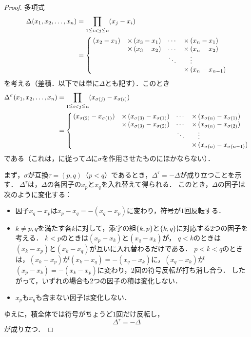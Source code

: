 \begin{tleftbar}
\begin{proof}
  多項式
\begin{align*}
\Delta(x_1,x_2,\dots,x_n)
  &= \prod_{1 \leqq i < j \leqq n}(x_j-x_i) \\
  &= \left\{\,\begin{array}{@{}c@{\quad}r@{\,}l@{\quad}c@{\quad}r@{\,}l@{}}
(x_2-x_1)
  & \times & (x_3-x_1)
  & \cdots
  & \times & (x_n-x_1)\\
  & \times & (x_3-x_2)
  & \cdots
  & \times & (x_n-x_2)\\
  &        &
  & \ddots
  &        & \vdots\\
  &        &
  &
  & \times & (x_n-x_{n-1})
\end{array}\right.
\end{align*}
  を考える（差積．以下では単に$\Delta$とも記す）．このとき
\begin{align*}
\Delta^{\sigma}(x_1,x_2,\dots,x_n)
  &= \prod_{1 \leqq i < j \leqq n}
     (x_{\sigma(j)}-x_{\sigma(i)}) \\
  &= \left\{\,\begin{array}{@{}c@{\quad}r@{\,}l@{\quad}c@{\quad}r@{\,}l@{}}
(x_{\sigma(2)}-x_{\sigma(1)})
  & \times & (x_{\sigma(3)}-x_{\sigma(1)})
  & \cdots
  & \times & (x_{\sigma(n)}-x_{\sigma(1)})\\
  & \times & (x_{\sigma(3)}-x_{\sigma(2)})
  & \cdots
  & \times & (x_{\sigma(n)}-x_{\sigma(2)})\\
  &        &
  & \ddots
  &        & \vdots\\
  &        &
  &
  & \times & (x_{\sigma(n)}-x_{\sigma(n-1)})
\end{array}\right.
\end{align*}
  である（これは，に従って$\Delta$に$\sigma$を作用させたものにほかならない）．

  まず，$\sigma$が互換$\tau = (p, q)$（$p < q$）であるとき，$\Delta^{\tau} = -\Delta$が成り立つことを示す．
  $\Delta^{\tau}$は，$\Delta$の各因子の$x_p$と$x_q$を入れ替えて得られる．
  このとき，$\Delta$の因子は次のように変化する：
  \begin{itemize}
    \item 因子$x_q - x_p$は$x_p - x_q = -(x_q - x_p)$に変わり，符号が$1$回反転する．
    \item $k \ne p, q$を満たす各$k$に対して，添字の組$\{k, p\}$と$\{k, q\}$に対応する$2$つの因子を考える．
      $k < p$のときは$(x_p - x_k)$と$(x_q - x_k)$が，
      $q < k$のときは$(x_k - x_p)$と$(x_k - x_q)$が互いに入れ替わるだけである．
      $p < k < q$のときは，$(x_k - x_p)$が$(x_k - x_q) = -(x_q - x_k)$に，$(x_q - x_k)$が$(x_p - x_k) = -(x_k - x_p)$に変わり，$2$回の符号反転が打ち消し合う．
      したがって，いずれの場合も$2$つの因子の積は変化しない．
    \item $x_p$も$x_q$も含まない因子は変化しない．
  \end{itemize}
  ゆえに，積全体では符号がちょうど$1$回だけ反転し，
  \[
    \Delta^{\tau} = -\Delta
  \]
  が成り立つ．


\end{proof}
\end{tleftbar}
